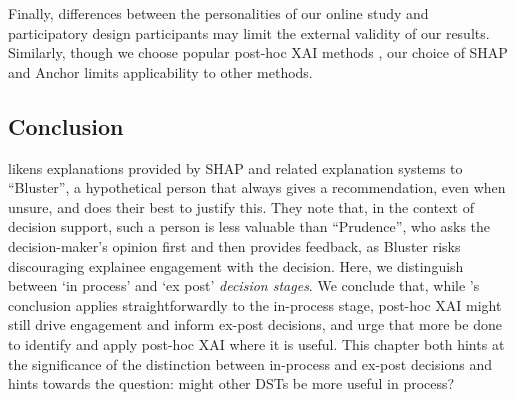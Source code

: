 Finally, differences between the personalities of our online study and participatory design participants may limit the external validity of our results. Similarly, though we choose popular post-hoc XAI methods \cite{barocas_hidden_2020,kumar_problems_2020,weerts_human-grounded_2019,ribeiro_nothing_2016}, our choice of SHAP and Anchor limits applicability to other methods.

\subsection{Conclusion}
\textcite{miller_explainable_2023} likens explanations provided by SHAP and related explanation systems to ``Bluster'', a hypothetical person that always gives a recommendation, even when unsure, and does their best to justify this. They note that, in the context of decision support, such a person is less valuable than ``Prudence'', who asks the decision-maker's opinion first and then provides feedback, as Bluster risks discouraging explainee engagement with the decision. Here, we distinguish between `in process' and `ex post' \emph{decision stages}. We conclude that, while \textcite{miller_explainable_2023}'s conclusion applies straightforwardly to the in-process stage, post-hoc XAI might still drive engagement and inform ex-post decisions, and urge that more be done to identify and apply post-hoc XAI where it is useful. This chapter both hints at the significance of the distinction between in-process and ex-post decisions and hints towards the question: might other DSTs be more useful in process?
